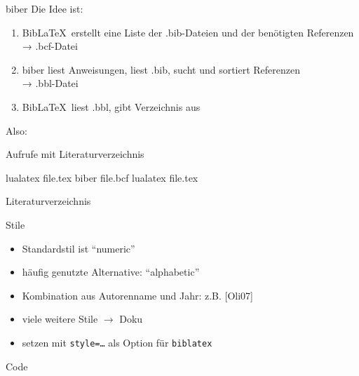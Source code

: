 \begin{frame}[fragile]{biber}
  Die Idee ist:
  \begin{enumerate}
    \item Bib\LaTeX\ erstellt eine Liste der .bib-Dateien und der benötigten Referenzen\\
          → .bcf-Datei
    \item biber liest Anweisungen, liest .bib, sucht und sortiert Referenzen\\
          → .bbl-Datei
    \item Bib\LaTeX\ liest .bbl, gibt Verzeichnis aus
  \end{enumerate}

  \vspace{10pt}
  Also:
  \begin{block}{Aufrufe mit Literaturverzeichnis}
    \begin{lstverbatim}
     lualatex file.tex
     biber file.bcf
     lualatex file.tex
    \end{lstverbatim}
  \end{block}
\end{frame}

\begin{frame}{Literaturverzeichnis}
  \nocite{*}
  \printbibliography[heading=none]
\end{frame}
\begin{frame}[fragile]{Stile}
  \begin{itemize}
    \item Standardstil ist \enquote{numeric}
    \item häufig genutzte Alternative: \enquote{alphabetic}
    \item Kombination aus Autorenname und Jahr: z.B. [Oli07]
    \item viele weitere Stile $\rightarrow$ Doku
    \item setzen mit \texttt{style=…} als Option für \texttt{biblatex}
  \end{itemize}
  \begin{block}{Code}
    \begin{lstverbatim}
      \usepackage[backend=biber, style=alphabetic]{biblatex}
    \end{lstverbatim}
  \end{block}
\end{frame}
